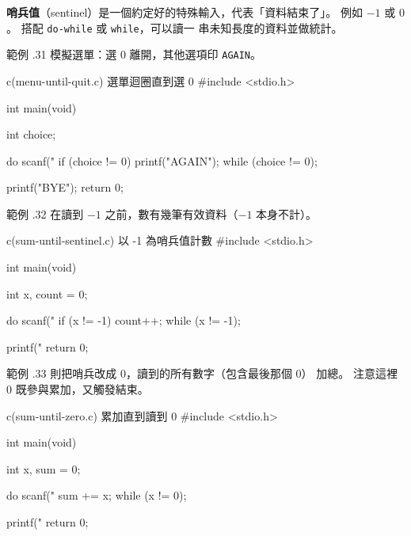\textbf{哨兵值}（sentinel）是一個約定好的特殊輸入，代表「資料結束了」。 
例如 $-1$ 或 $0$。 搭配 \texttt{do-while} 或 \texttt{while}，可以讀一
串未知長度的資料並做統計。

範例 \thechapter.31 模擬選單：選 $0$ 離開，其他選項印 \texttt{AGAIN}。

\begin{example}{c}{(menu-until-quit.c) 選單迴圈直到選 0}
#include <stdio.h>

int main(void) {
    int choice;

    do {
        scanf("%
        if (choice != 0) {
            printf("AGAIN\n");
        }
    } while (choice != 0);

    printf("BYE\n");
    return 0;
}
\end{example}


範例 \thechapter.32 在讀到 $-1$ 之前，數有幾筆有效資料（$-1$ 本身不計）。

\begin{example}{c}{(sum-until-sentinel.c) 以 -1 為哨兵值計數}
#include <stdio.h>

int main(void) {
    int x, count = 0;

    do {
        scanf("%
        if (x != -1) {
            count++;
        }
    } while (x != -1);

    printf("%
    return 0;
}
\end{example}


範例 \thechapter.33 則把哨兵改成 $0$，讀到的所有數字（包含最後那個 $0$）
加總。 注意這裡 $0$ 既參與累加，又觸發結束。

\begin{example}{c}{(sum-until-zero.c) 累加直到讀到 0}
#include <stdio.h>

int main(void) {
    int x, sum = 0;

    do {
        scanf("%
        sum += x;
    } while (x != 0);

    printf("%
    return 0;
}
\end{example}

